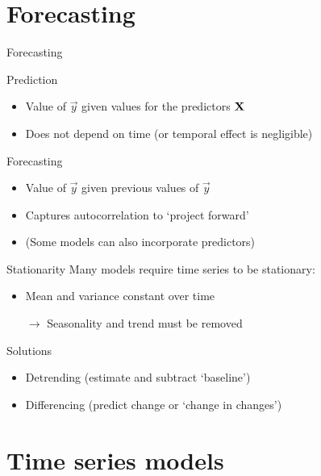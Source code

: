 \section{Forecasting}

\begin{frame}{Forecasting}
    \begin{block}{Prediction}
        \begin{itemize}
            \item Value of $\vec{y}$ given values for the predictors $\mathbf{X}$
            \item Does not depend on time (or temporal effect is negligible)
        \end{itemize}
    \end{block}
    \vfill\pause
    \begin{block}{Forecasting}
        \begin{itemize}
            \item Value of $\vec{y}$ given \alert{previous values} of $\vec{y}$
            \item Captures autocorrelation to `project forward'
            \item (Some models can also incorporate predictors)
        \end{itemize}
    \end{block}
\end{frame}

\begin{frame}{Stationarity}
    Many models require time series to be \alert{stationary}:\vspace{-1ex}
    \begin{itemize}
        \item Mean and variance constant over time
        \item[$\rightarrow$] Seasonality and trend must be removed
    \end{itemize}
    \vfill\pause
    \begin{block}{Solutions}
        \begin{itemize}
            \item Detrending (estimate and subtract `baseline')
            \item Differencing (predict change or `change in changes')
        \end{itemize}
    \end{block}
\end{frame}

\section{Time series models}

